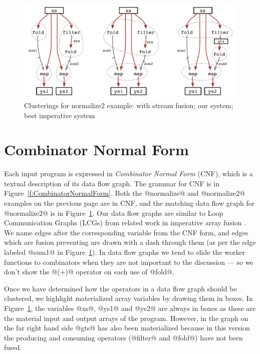 
\begin{figure}[ht!]
\begin{center}
\includegraphics[scale=0.5]{figures/ex1-compare.pdf}
\end{center}
\caption{Clusterings for normalize2 example: with stream fusion; our system; best imperative system}
\label{f:normalize2-clusterings}
\end{figure}


\section{Combinator Normal Form}
Each input program is expressed in \emph{Combinator Normal Form} (CNF), which is a textual description of its data flow graph. The grammar for CNF is in Figure~\ref{f:CombinatorNormalForm}. Both the @normalize@ and @normalize2@ examples on the previous page are in CNF, and the matching data flow graph for @normalize2@ is in Figure~\ref{f:normalize2-clusterings}. Our data flow graphs are similar to Loop Communication Graphs (LCGs) from related work in imperative array fusion \CITE. We name edges after the corresponding variable from the CNF form, and edges which are fusion preventing are drawn with a dash through them (as per the edge labeled @sum1@ in Figure~\ref{f:normalize2-clusterings}). In data flow graphs we tend to elide the worker functions to combinators when they are not important to the discussion --- so we don't show the @(+)@ operator on each use of @fold@.

Once we have determined how the operators in a data flow graph should be clustered, we highlight materialized array variables by drawing them in boxes. In Figure~\ref{f:normalize2-clusterings}, the variables @xs@, @ys1@ and @ys2@ are always in boxes as these are the material input and output arrays of the program. However, in the graph on the far right hand side @gts@ has also been materialized because in this version the producing and consuming operators (@filter@ and @fold@) have not been fused.


